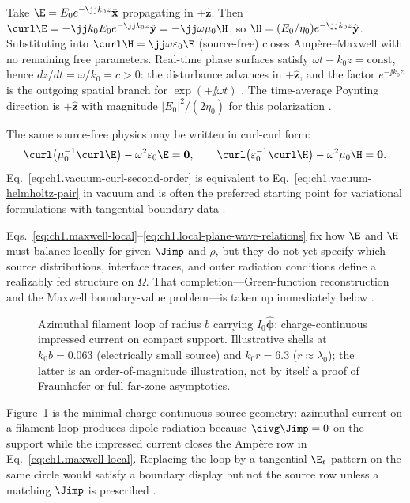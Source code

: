 Take $\E=E_0 e^{-\jj k_0 z}\hat{\mathbf{x}}$ propagating in $+\hat{\mathbf{z}}$. Then $\curl\E=-\jj k_0 E_0 e^{-\jj k_0 z}\hat{\mathbf{y}}=-\jj\omega\mu_0\H$, so $\H=(E_0/\eta_0)e^{-\jj k_0 z}\hat{\mathbf{y}}$. Substituting into $\curl\H=\jj\omega\varepsilon_0\E$ (source-free) closes Amp\`ere--Maxwell with no remaining free parameters. Real-time phase surfaces satisfy $\omega t-k_0 z=\mathrm{const}$, hence $dz/dt=\omega/k_0=c>0$: the disturbance advances in $+\hat{\mathbf{z}}$, and the factor $e^{-\jj k_0 z}$ is the outgoing spatial branch for $\exp(+\jj\omega t)$ \cite{stratton1941,jackson1999}. The time-average Poynting direction is $+\hat{\mathbf{z}}$ with magnitude $|E_0|^2/(2\eta_0)$ for this polarization \cite{stratton1941}.

The same source-free physics may be written in curl-curl form:
\begin{equation}
\label{eq:ch1.vacuum-curl-second-order}
\curl\!\left(\mu_0^{-1}\curl \E\right)-\omega^2\varepsilon_0\E=\mathbf{0},\qquad
\curl\!\left(\varepsilon_0^{-1}\curl \H\right)-\omega^2\mu_0\H=\mathbf{0}.
\end{equation}
Eq.~\eqref{eq:ch1.vacuum-curl-second-order} is equivalent to Eq.~\eqref{eq:ch1.vacuum-helmholtz-pair} in vacuum and is often the preferred starting point for variational formulations with tangential boundary data \cite{stratton1941}.

Eqs.~\eqref{eq:ch1.maxwell-local}--\eqref{eq:ch1.local-plane-wave-relations} fix how $\E$ and $\H$ must balance locally for given $\Jimp$ and $\rho$, but they do not yet specify which source distributions, interface traces, and outer radiation conditions define a realizably fed structure on $\Omega$. That completion---Green-function reconstruction and the Maxwell boundary-value problem---is taken up immediately below \cite{stratton1941}.


\begin{figure}[t]
\centering
\VolIPhysFig{\VolIPhysDipoleLoop}
\caption{Azimuthal filament loop of radius $b$ carrying $I_0\hat{\boldsymbol{\phi}}$: charge-continuous impressed current on compact support. Illustrative shells at $k_0 b=0.063$ (electrically small source) and $k_0 r=6.3$ ($r\approx\lambda_0$); the latter is an order-of-magnitude illustration, not by itself a proof of Fraunhofer or full far-zone asymptotics.}
\label{fig:ch1.wp-solenoidal-loop}
\end{figure}

Figure~\ref{fig:ch1.wp-solenoidal-loop} is the minimal charge-continuous source geometry: azimuthal
current on a filament loop produces dipole radiation because $\divg\Jimp=0$ on the support while
the impressed current closes the Amp\`ere row in Eq.~\eqref{eq:ch1.maxwell-local}. Replacing the
loop by a tangential $\E_t$ pattern on the same circle would satisfy a boundary display but not
the source row unless a matching $\Jimp$ is prescribed \cite{stratton1941,harrington2001}.

